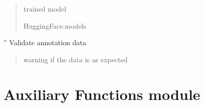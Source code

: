 \documentclass[letterpaper,10pt,english]{sphinxmanual}
\begin{document}
\begin{fulllineitems}
\begin{fulllineitems}
\begin{quote}
\begin{description}
\sphinxAtStartPar
trained model

\sphinxAtStartPar
HuggingFace.models

\end{description}\end{quote}

\end{fulllineitems}


\begin{fulllineitems}
\label{\detokenize{BeeClassification:BeeClassification.BeeClassification.validate_annotation_csv}}
\pysigstartsignatures
{}
\pysigstopsignatures
\sphinxAtStartPar
”
Validate annotation data
\begin{quote}\begin{description}
\sphinxAtStartPar
warning if the data is as expected

\end{description}\end{quote}

\end{fulllineitems}


\end{fulllineitems}


\sphinxstepscope


\section{Auxiliary Functions module}
\label{\detokenize{auxilary_functions:module-auxilary_functions}}\label{\detokenize{auxilary_functions:auxiliary-functions-module}}\label{\detokenize{auxilary_functions::doc}}
\end{document}
